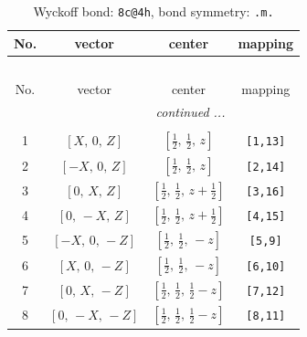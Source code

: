 \documentclass[fleqn,8pt]{jsarticle}
\begin{document}
\renewcommand{\arraystretch}{1.2}
\begin{longtable}{cccc}
\caption{Wyckoff bond: {\tt 8c@4h}, bond symmetry: {\tt .m.}}
 \\
 \hline \hline
No. & vector & center & mapping \\ \hline \endfirsthead

\multicolumn{3}{l}{\tablename\ \thetable{}} \\
 \hline \hline
No. & vector & center & mapping \\ \hline \endhead

 \hline \hline
\multicolumn{3}{r}{\footnotesize\it continued ...} \\ \endfoot

 \hline \hline
\multicolumn{3}{r}{} \\ \endlastfoot

1 & $\left[ X,\, 0,\, Z \right]$ & $\left[ \frac{1}{2},\, \frac{1}{2},\, z \right]$ & {\tt [1,13]} \\ \hline
2 & $\left[ - X,\, 0,\, Z \right]$ & $\left[ \frac{1}{2},\, \frac{1}{2},\, z \right]$ & {\tt [2,14]} \\ \hline
3 & $\left[ 0,\, X,\, Z \right]$ & $\left[ \frac{1}{2},\, \frac{1}{2},\, z + \frac{1}{2} \right]$ & {\tt [3,16]} \\ \hline
4 & $\left[ 0,\, - X,\, Z \right]$ & $\left[ \frac{1}{2},\, \frac{1}{2},\, z + \frac{1}{2} \right]$ & {\tt [4,15]} \\ \hline
5 & $\left[ - X,\, 0,\, - Z \right]$ & $\left[ \frac{1}{2},\, \frac{1}{2},\, - z \right]$ & {\tt [5,9]} \\ \hline
6 & $\left[ X,\, 0,\, - Z \right]$ & $\left[ \frac{1}{2},\, \frac{1}{2},\, - z \right]$ & {\tt [6,10]} \\ \hline
7 & $\left[ 0,\, X,\, - Z \right]$ & $\left[ \frac{1}{2},\, \frac{1}{2},\, \frac{1}{2} - z \right]$ & {\tt [7,12]} \\ \hline
8 & $\left[ 0,\, - X,\, - Z \right]$ & $\left[ \frac{1}{2},\, \frac{1}{2},\, \frac{1}{2} - z \right]$ & {\tt [8,11]} \\
\end{longtable}
\renewcommand{\arraystretch}{1.2}
\end{document}
